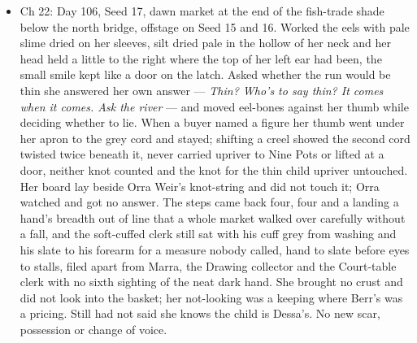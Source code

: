 \documentclass{design/chronicle}
\begin{document}
{\begin{itemize}[leftmargin=1.4em,itemsep=1pt,topsep=3pt,parsep=0pt]
\item Ch 22: Day 106, Seed 17, dawn market at the end of the fish-trade shade below the north bridge, offstage on Seed 15 and 16. Worked the eels with pale slime dried on her sleeves, silt dried pale in the hollow of her neck and her head held a little to the right where the top of her left ear had been, the small smile kept like a door on the latch. Asked whether the run would be thin she answered her own answer — \emph{Thin? Who’s to say thin? It comes when it comes. Ask the river} — and moved eel-bones against her thumb while deciding whether to lie. When a buyer named a figure her thumb went under her apron to the grey cord and stayed; shifting a creel showed the second cord twisted twice beneath it, never carried upriver to Nine Pots or lifted at a door, neither knot counted and the knot for the thin child upriver untouched. Her board lay beside Orra Weir’s knot-string and did not touch it; Orra watched and got no answer. The steps came back four, four and a landing a hand’s breadth out of line that a whole market walked over carefully without a fall, and the soft-cuffed clerk still sat with his cuff grey from washing and his slate to his forearm for a measure nobody called, hand to slate before eyes to stalls, filed apart from Marra, the Drawing collector and the Court-table clerk with no sixth sighting of the neat dark hand. She brought no crust and did not look into the basket; her not-looking was a keeping where Berr’s was a pricing. Still had not said she knows the child is Dessa’s. No new scar, possession or change of voice.

\end{itemize}

\begin{itemize}[leftmargin=1.4em,itemsep=1pt,topsep=3pt,parsep=0pt]


\end{itemize}}
\end{document}
